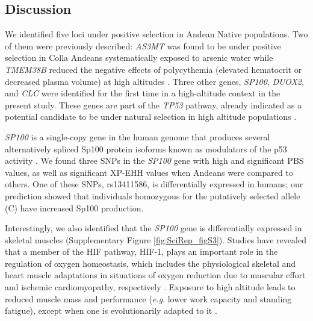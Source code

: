 \subsection{Discussion}

We identified five loci under positive selection in Andean Native populations. Two of them were previously described: \textsl{AS3MT} was found to be under positive selection in Colla Andeans systematically exposed to arsenic water \cite{eichstaedt_positive_2015} while \textsl{TMEM38B} reduced the negative effects of polycythemia (elevated hematocrit or decreased plasma volume) at high altitudes \cite{crawford_natural_2017}. Three other genes, \textsl{SP100}, \textsl{DUOX2}, and \textsl{CLC} were identified for the first time in a high-altitude context in the present study. These genes are part of the \textsl{TP53} pathway, already indicated as a potential candidate to be under natural selection in high altitude populations \cite{eichstaedt_andean_2014,jacovas_genetic_2015}.

\textsl{SP100} is a single-copy gene in the human genome that produces several alternatively spliced Sp100 protein isoforms known as modulators of the p53 activity \cite{berscheminski_sp100a_2016}. We found three SNPs in the \textsl{SP100} gene with high and significant PBS values, as well as significant XP-EHH values when Andeans were compared to others. One of these SNPs, rs13411586, is differentially expressed in humans; our prediction showed that individuals homozygous for the putatively selected allele (C) have increased Sp100 production.

Interestingly, we also identified that the \textsl{SP100} gene is differentially expressed in skeletal muscles (Supplementary Figure \ref{fig:SciRep_figS3}). Studies have revealed that a member of the HIF pathway, HIF-1, plays an important role in the regulation of oxygen homeostasis, which includes the physiological skeletal and heart muscle adaptations in situations of oxygen reduction due to muscular effort \cite{semenza_regulation_1999,vogt_einfluss_2003,lindholm_skeletal_2016} and ischemic cardiomyopathy, respectively \cite{herrer_gene_2015}. Exposure to high altitude leads to reduced muscle mass and performance (\textit{e.g}. lower work capacity and standing fatigue), except when one is evolutionarily adapted to it \cite{marconi_work_2006,brutsaert_high-altitude_2008,counter_assessment_2017}.

